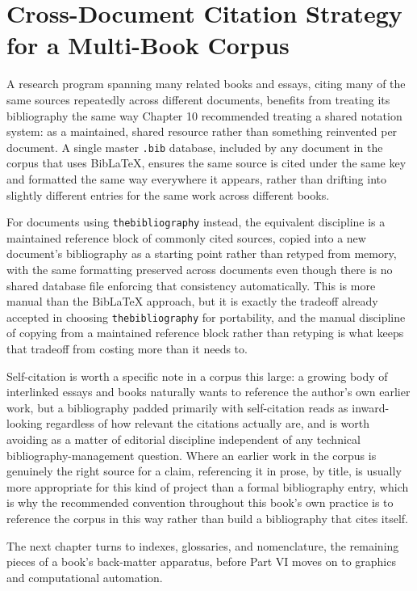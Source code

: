 \hypertarget{cross-document-citation-strategy-for-a-multi-book-corpus}{%
\section{Cross-Document Citation Strategy for a Multi-Book Corpus}\label{cross-document-citation-strategy-for-a-multi-book-corpus}}

A research program spanning many related books and essays, citing many of the same sources repeatedly across different documents, benefits from treating its bibliography the same way Chapter 10 recommended treating a shared notation system: as a maintained, shared resource rather than something reinvented per document. A single master \texttt{.bib} database, included by any document in the corpus that uses BibLaTeX, ensures the same source is cited under the same key and formatted the same way everywhere it appears, rather than drifting into slightly different entries for the same work across different books.

For documents using \texttt{thebibliography} instead, the equivalent discipline is a maintained reference block of commonly cited sources, copied into a new document's bibliography as a starting point rather than retyped from memory, with the same formatting preserved across documents even though there is no shared database file enforcing that consistency automatically. This is more manual than the BibLaTeX approach, but it is exactly the tradeoff already accepted in choosing \texttt{thebibliography} for portability, and the manual discipline of copying from a maintained reference block rather than retyping is what keeps that tradeoff from costing more than it needs to.

Self-citation is worth a specific note in a corpus this large: a growing body of interlinked essays and books naturally wants to reference the author's own earlier work, but a bibliography padded primarily with self-citation reads as inward-looking regardless of how relevant the citations actually are, and is worth avoiding as a matter of editorial discipline independent of any technical bibliography-management question. Where an earlier work in the corpus is genuinely the right source for a claim, referencing it in prose, by title, is usually more appropriate for this kind of project than a formal bibliography entry, which is why the recommended convention throughout this book's own practice is to reference the corpus in this way rather than build a bibliography that cites itself.

The next chapter turns to indexes, glossaries, and nomenclature, the remaining pieces of a book's back-matter apparatus, before Part VI moves on to graphics and computational automation.
